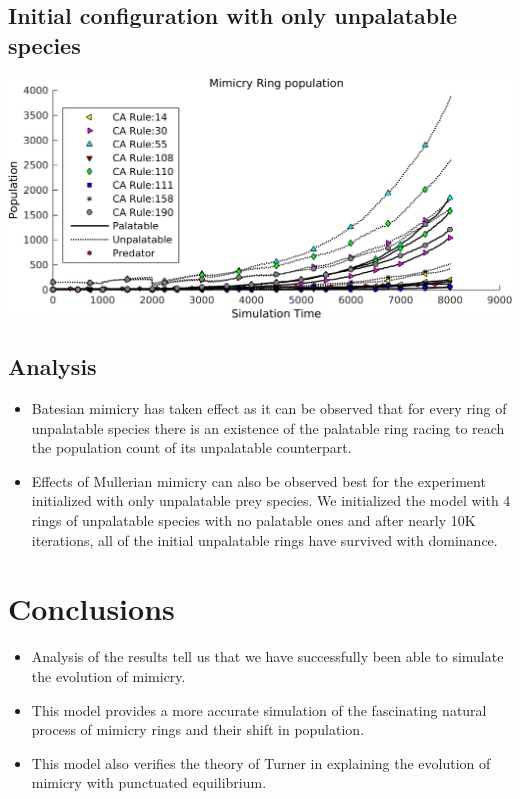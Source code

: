 \documentclass[a0,portrait]{a0poster}
\begin{document}
\begin{multicols}{2}
\subsection*{Initial configuration with only unpalatable species}

\begin{center}\vspace{1cm}
\includegraphics[width=0.8\linewidth]{simTime8k-4Prey-unp.png}
\end{center}\vspace{1cm}

\subsection*{Analysis}
\begin{itemize}
\item Batesian mimicry has taken effect as it can be observed that for every ring of unpalatable species there is an existence of the palatable ring racing to reach the population count of its unpalatable counterpart.
\item Effects of Mullerian mimicry can also be observed best for the experiment initialized with only unpalatable prey species. We initialized the model with 4 rings of unpalatable species with no palatable ones and after nearly 10K iterations, all of the initial unpalatable rings have survived with dominance. 
\end{itemize}

\color{SaddleBrown} %

\section*{Conclusions}
\begin{itemize}
\item Analysis of the results tell us that we have successfully been able to simulate the evolution of mimicry.
\item This model provides a more accurate simulation of the fascinating natural process of mimicry rings and their shift in population. 
\item This model also verifies the theory of Turner in explaining the evolution of mimicry with punctuated equilibrium.
\end{itemize}


\end{multicols}
\end{document}
